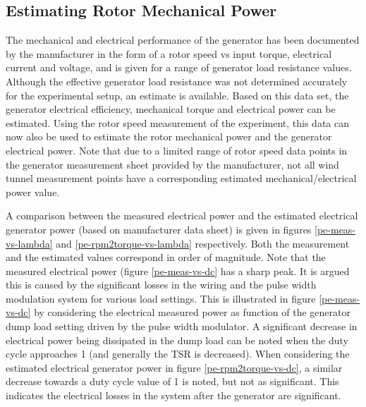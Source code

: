 \documentclass[a4paper]{jpconf}
\begin{document}
\subsection{Estimating Rotor Mechanical Power}

The mechanical and electrical performance of the generator has been documented by the manufacturer in the form of a rotor speed vs input torque, electrical current and voltage, and is given for a range of generator load resistance values. Although the effective generator load resistance was not determined accurately for the experimental setup, an estimate is available. Based on this data set, the generator electrical efficiency, mechanical torque and electrical power can be estimated. Using the rotor speed measurement of the experiment, this data can now also be used to estimate the rotor mechanical power and the generator electrical power. Note that due to a limited range of rotor speed data points in the generator measurement sheet provided by the manufacturer, not all wind tunnel measurement points have a corresponding estimated mechanical/electrical power value.

A comparison between the measured electrical power and the estimated electrical generator power (based on manufacturer data sheet) is given in figures \ref{pe-meas-vs-lambda} and \ref{pe-rpm2torque-vs-lambda} respectively. Both the measurement and the estimated values correspond in order of magnitude. Note that the measured electrical power (figure \ref{pe-meas-vs-dc} has a sharp peak. It is argued this is caused by the significant losses in the wiring and the pulse width modulation system for various load settings. This is illustrated in figure \ref{pe-meas-vs-dc} by considering the electrical measured power as function of the generator dump load setting driven by the pulse width modulator. A significant decrease in electrical power being dissipated in the dump load can be noted when the duty cycle approaches 1 (and generally the TSR is decreased). When considering the estimated electrical generator power in figure \ref{pe-rpm2torque-vs-dc}, a similar decrease towards a duty cycle value of 1 is noted, but not as significant. This indicates the electrical losses in the system after the generator are significant.
\end{document}
